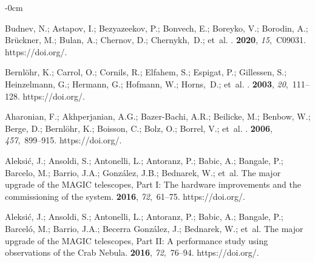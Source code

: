 \documentclass[universe,article,accept,moreauthors,pdftex]{Definitions/mdpi}
\begin{document}
\begin{adjustwidth}{-\extralength}{0cm}
\begin{thebibliography}{999}
Budnev, N.; Astapov, I.; Bezyazeekov, P.; Bonvech, E.; Boreyko, V.; Borodin, A.; Brückner, M.; Bulan, A.; Chernov, D.; Chernykh,~D.; et~al.
.
 {\bf 2020}, {\em 15},~C09031.
\newblock
  https://doi.org/{\href{https://doi.org/10.1088/1748-0221/15/09/c09031}{}}.

Bernlöhr, K.; Carrol, O.; Cornils, R.; Elfahem, S.; Espigat, P.; Gillessen, S.; Heinzelmann, G.; Hermann, G.; Hofmann, W.; Horns,~D.; et~al.
.
 {\bf 2003}, {\em 20},~111--128.
\newblock
  https://doi.org/{\href{https://doi.org/10.1016/S0927-6505(03)00171-3}{}}.

{Aharonian}, F.; {Akhperjanian}, A.G.; {Bazer-Bachi}, A.R.; Beilicke, M.; Benbow, W.; Berge, D.; Bernlöhr, K.; Boisson, C.; Bolz, O.; Borrel, V.; et~al.
.
 {\bf 2006}, {\em 457},~899--915.
\newblock
  https://doi.org/{\href{https://doi.org/10.1051/0004-6361:20065351}{}}.

Aleksić, J.; Ansoldi, S.; Antonelli, L.; Antoranz, P.; Babic, A.; Bangale, P.; Barcelo, M.; Barrio, J.A.; González, J.B.; Bednarek, W.; et~al.
\newblock The major upgrade of the MAGIC telescopes, Part I: The hardware
  improvements and the commissioning of the system.
 {\bf 2016}, {\em 72},~61--75.
\newblock
  https://doi.org/{\href{https://doi.org/10.1016/j.astropartphys.2015.04.004}{}}.

Aleksić, J.; Ansoldi, S.; Antonelli, L.; Antoranz, P.; Babic, A.; Bangale, P.; Barceló, M.; Barrio, J.A.; Becerra González, J.; Bednarek, W.; et~al.
\newblock The major upgrade of the {MAGIC} telescopes, {Part II}: A performance
  study using observations of the {Crab} {Nebula}.
 {\bf 2016}, {\em 72},~76--94.
\newblock
  https://doi.org/{\href{https://doi.org/10.1016/j.astropartphys.2015.02.005}{}}.


\end{thebibliography}
\end{adjustwidth}
\end{document}
